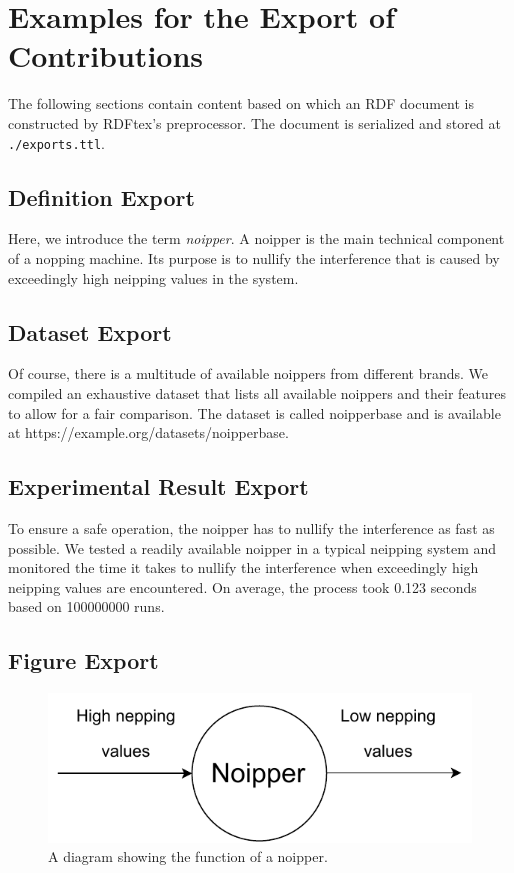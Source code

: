 
\section{Examples for the Export of Contributions}

The following sections contain content based on which an RDF document is constructed by RDFtex's preprocessor. The document is serialized and stored at \texttt{./exports.ttl}.

\subsection{Definition Export}

Here, we introduce the term \emph{noipper}. A noipper is the main technical component of a nopping machine. Its purpose is to nullify the interference that is caused by exceedingly high neipping values in the system.

\subsection{Dataset Export}

Of course, there is a multitude of available noippers from different brands. We compiled an exhaustive dataset that lists all available noippers and their features to allow for a fair comparison. The dataset is called noipperbase and is available at https://example.org/datasets/noipperbase.

\subsection{Experimental Result Export}

To ensure a safe operation, the noipper has to nullify the interference as fast as possible. We tested a readily available noipper in a typical neipping system and monitored the time it takes to nullify the interference when exceedingly high neipping values are encountered. On average, the process took 0.123 seconds based on 100000000 runs.  

\subsection{Figure Export}

\begin{figure}[htb!]
    \centering
    \includegraphics[width=0.8\columnwidth]{./figures/noipper_function}
    \caption{A diagram showing the function of a noipper.}
    \label{fig:scikg-structure}
\end{figure}

